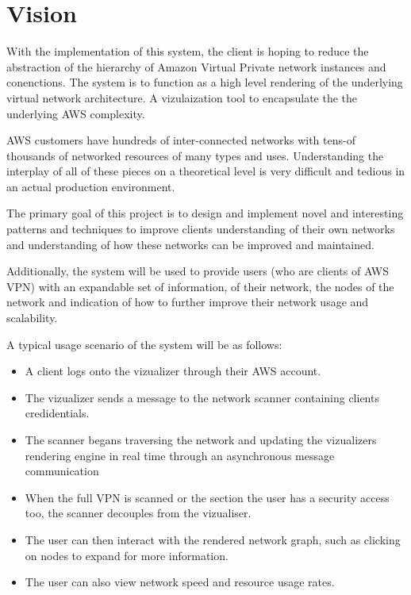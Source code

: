\documentclass[a4paper,12pt]{report}
\begin{document}
\section{Vision}

With the implementation of this system, the client is hoping to reduce the abstraction of the hierarchy of  Amazon Virtual Private network instances and conenctions. The system is to function as a high level rendering of the underlying virtual network architecture. A vizulaization tool to encapsulate the the underlying AWS complexity.

AWS customers have hundreds of inter-connected networks with tens-of thousands of networked resources of many types and uses. Understanding the interplay of all of these pieces on a theoretical level is very difficult and tedious in an actual production environment.

The primary goal of this project is to design and implement novel and interesting patterns and techniques to improve clients understanding of their own networks and understanding of how these networks can be improved and maintained.

Additionally, the system will be used to provide users (who are clients of AWS VPN) with an expandable set of information, of their network, the nodes of the network and indication of how to further improve their network usage and scalability.

A typical usage scenario of the system will be as follows: 

\begin{itemize}
    \item A client logs onto the vizualizer through their AWS account.
\end{itemize}
\begin{itemize}
    \item The vizualizer sends a message to the network scanner containing clients credidentials.
\end{itemize}
\begin{itemize}
    \item The scanner begans traversing the network and updating the vizualizers rendering engine in real time through an asynchronous message communication
\end{itemize}
\begin{itemize}
    \item When the full VPN is scanned or the section the user has a security access too, the scanner decouples from the vizualiser.
\end{itemize}
\begin{itemize}
    \item The user can then interact with the rendered network graph, such as clicking on nodes to expand for more information.
\end{itemize}
\begin{itemize}
    \item The user can also view network speed and resource usage rates.
\end{itemize}
\end{document}
